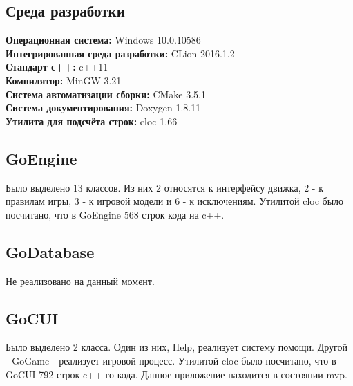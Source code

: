 
\subsection*{Среда разработки}
\textbf{
Операционная система:} Windows 10.0.10586\\
\textbf{Интегрированная среда разработки:} CLion 2016.1.2\\
\textbf{Стандарт с++:} c++11\\
\textbf{Компилятор:} MinGW 3.21\\
\textbf{Система автоматизации сборки:} CMake 3.5.1\\
\textbf{Система документирования:} Doxygen 1.8.11\\
\textbf{Утилита для подсчёта строк:} cloc 1.66\\

\subsection*{GoEngine}

Было выделено 13 классов. Из них 2 относятся к интерфейсу движка, 2 - к правилам игры, 3 - к игровой модели и 6 - к исключениям. Утилитой cloc было посчитано, что в GoEngine 568 строк кода на c++.

\subsection*{GoDatabase}

Не реализовано на данный момент.\\

\subsection*{GoCUI}

Было выделено 2 класса. Один из них, Help, реализует систему помощи. Другой - GoGame - реализует игровой процесс. Утилитой cloc было посчитано, что в GoCUI 792 строк c++-го кода. Данное приложение находится в состоянии mvp.

